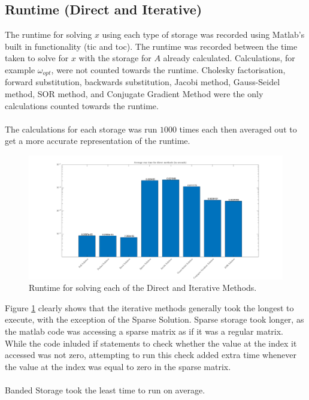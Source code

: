 \documentclass[12pt,a4paper]{article}
\begin{document}
\subsection{Runtime (Direct and Iterative)}
The runtime for solving $x$ using each type of storage was recorded using Matlab's built in functionality (tic and toc). The runtime was recorded between the time taken to solve for $x$ with the storage for $A$ already calculated. Calculations, for example $\omega_{opt}$, were not counted towards the runtime. Cholesky factorisation, forward substitution, backwards substitution, Jacobi method, Gauss-Seidel method, SOR method, and Conjugate Gradient Method were the only calculations counted towards the runtime.
\\\\
The calculations for each storage was run $1000$ times each then averaged out to get a more accurate representation of the runtime.
\begin{figure}[H]
	\includegraphics[width=\linewidth]{images/RuntimeGraph.png}
	\caption{Runtime for solving each of the Direct and Iterative Methods.}
	\label{fig:runtime}
\end{figure} Figure \ref{fig:runtime} clearly shows that the iterative methods generally took the longest to execute, with the exception of the Sparse Solution. Sparse storage took longer, as the matlab code was accessing a sparse matrix as if it was a regular matrix. While the code inluded if statements to check whether the value at the index it accessed was not zero, attempting to run this check added extra time whenever the value at the index was equal to zero in the sparse matrix.
\\\\
Banded Storage took the least time to run on average.
\end{document}
